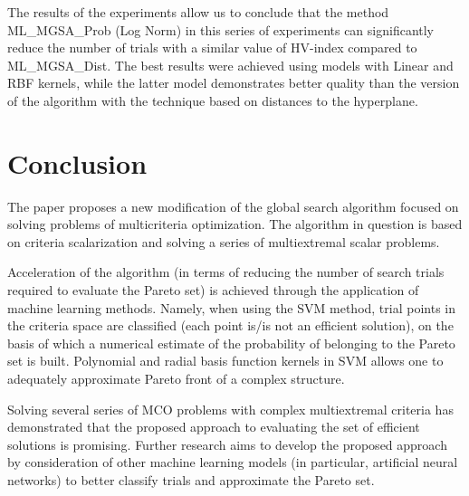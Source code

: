 \documentclass[runningheads]{llncs}
\begin{document}
The results of the experiments allow us to conclude that the method ML\_MGSA\_Prob (Log Norm) in this series of experiments can significantly reduce the number of trials with a similar value of HV-index compared to ML\_MGSA\_Dist. The best results were achieved using models with Linear and RBF kernels, while the latter model demonstrates better quality than the version of the algorithm with the technique \cite{ML_MCO_2023} based on distances to the hyperplane. 

\section{Conclusion}

The paper proposes a new modification of the global search algorithm focused on solving problems of multicriteria optimization. The algorithm in question is based on criteria scalarization and solving a series of multiextremal scalar problems. 

Acceleration of the algorithm (in terms of reducing the number of search trials required to evaluate the Pareto set) is achieved through the application of machine learning methods. Namely, when using the SVM method, trial points in the criteria space are classified (each point is/is not an efficient solution), on the basis of which a numerical estimate of the probability of belonging to the Pareto set is built. Polynomial and radial basis function kernels in SVM allows one to adequately approximate Pareto front of a complex structure. 

Solving several series of MCO problems with complex multiextremal criteria has demonstrated that the proposed approach to evaluating the set of efficient solutions is promising. Further research aims to develop the proposed approach by consideration of other machine learning models (in particular, artificial neural networks) to better classify trials and approximate the Pareto set.



%
%
%
 
 
%
%
%
%
%
\end{document}
